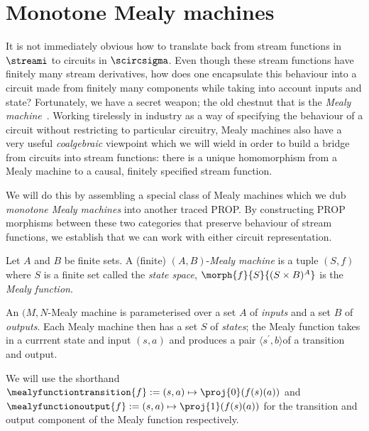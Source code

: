 \section{Monotone Mealy machines}

It is not immediately obvious how to translate back from stream functions in
\(\streami\) to circuits in \(\scircsigma\).
Even though these stream functions have finitely many stream derivatives, how
does one encapsulate this behaviour into a circuit made from finitely many
components while taking into account inputs and state?
Fortunately, we have a secret weapon; the old chestnut that is the
\emph{Mealy machine}~\cite{mealy1955method}.
Working tirelessly in industry as a way of specifying the behaviour of a
circuit without restricting to particular circuitry, Mealy machines also have
a very useful \emph{coalgebraic} viewpoint which we will wield in order to
build a bridge from circuits into stream functions: there is a unique
homomorphism from a Mealy machine to a causal, finitely specified stream
function.

We will do this by assembling a special class of Mealy machines which we dub
\emph{monotone Mealy machines} into another traced PROP.
By constructing PROP morphisms between these two categories that preserve
behaviour of stream functions, we establish that we can work with either
circuit representation.

\begin{definition}\label{def:mealy}
    Let \(A\) and \(B\) be finite sets.
    A (finite) \((A,B)\)-\emph{Mealy machine} is a tuple \((S, f)\) where
    \(S\) is a finite set called the \emph{state space},
    \(\morph{f}{S}{(S \times B)^A}\) is the \emph{Mealy function}.
\end{definition}

An \((M,N\)-Mealy machine is parameterised over a set \(A\) of \emph{inputs} and
a set \(B\) of \emph{outputs}.
Each Mealy machine then has a set \(S\) of \emph{states}; the Mealy function
takes in a currrent state and input \((s, a)\) and produces a pair
\(\langle{s^\prime, b}\rangle\)of a transition and output.

\begin{notation}
    We will use the shorthand \(
    \mealyfunctiontransition{f} := (s, a) \mapsto \proj{0}(f(s)(a))
\) and \(
    \mealyfunctionoutput{f} := (s, a) \mapsto \proj{1}(f(s)(a))
\) for the transition and output component of the Mealy function respectively.
\end{notation}

